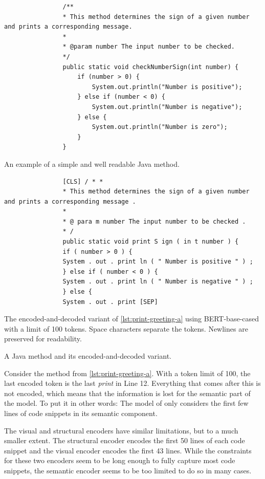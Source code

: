 \documentclass[%
class=scrreprt,
chapterprefix=false,%
open=right,%
twoside=false,%
paper=a4,%
logofile={Logo\_zentral\_farbig\_EN.png},%
thesistype=master,%
UKenglish,%
]{se2thesis}
\theoremstyle{definition}
\begin{document}
	\begin{listing}[p]
		\begin{sublisting}{\linewidth}
			\begin{verbatim}
				/**
				* This method determines the sign of a given number and prints a corresponding message.
				*
				* @param number The input number to be checked.
				*/
				public static void checkNumberSign(int number) {
					if (number > 0) {
						System.out.println("Number is positive");
					} else if (number < 0) {
						System.out.println("Number is negative");
					} else {
						System.out.println("Number is zero");
					}
				}
			\end{verbatim}
			\caption{An example of a simple and well readable Java method.}
			\label{lst:print-greeting-a}
		\end{sublisting}
		
		\begin{sublisting}{\linewidth}
			\begin{verbatim}
				[CLS] / * *
				* This method determines the sign of a given number and prints a corresponding message .
				*
				* @ para m number The input number to be checked .
				* /
				public static void print S ign ( in t number ) {
				if ( number > 0 ) {
				System . out . print ln ( " Number is positive " ) ;
				} else if ( number < 0 ) {
				System . out . print ln ( " Number is negative " ) ;
				} else {
				System . out . print [SEP]
			\end{verbatim}
			\caption{The encoded-and-decoded variant of \autoref{lst:print-greeting-a} using BERT-base-cased with a limit of 100 tokens. Space characters separate the tokens. Newlines are preserved for readability.}
			\label{lst:print-greeting-b}
		\end{sublisting}
		\caption{A Java method and its encoded-and-decoded variant.}
		\label{lst:print-greeting}
	\end{listing}
	
	Consider the method from \autoref{lst:print-greeting-a}. With a token limit of 100, the last encoded token is the last \textit{print} in Line 12. Everything that comes after this is not encoded, which means that the information is lost for the semantic part of the model. To put it in other words: The model of \citeauthor{mi2022towards} only considers the first few lines of code snippets in its semantic component.
	
	The visual and structural encoders have similar limitations, but to a much smaller extent. The structural encoder encodes the first 50 lines of each code snippet and the visual encoder encodes the first 43 lines. While the constraints for these two encoders seem to be long enough to fully capture most code snippets, the semantic encoder seems to be too limited to do so in many cases.
\end{document}
